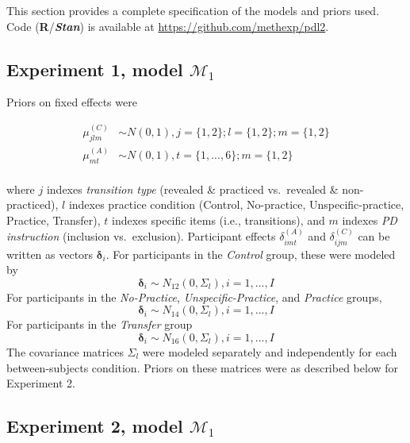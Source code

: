 \documentclass[english,,man]{apa6}
\begin{document}
\begin{appendix}
This section provides a complete specification of the models and priors
used. Code (\textbf{\textsf{R}}/\textbf{\textit{Stan}}) is available at
\url{https://github.com/methexp/pdl2}.

\hypertarget{experiment-1-model-mathcalm_1-1}{%
\subsection{\texorpdfstring{Experiment 1, model
\(\mathcal{M}_1\)}{Experiment 1, model \textbackslash{}mathcal\{M\}\_1}}\label{experiment-1-model-mathcalm_1-1}}

Priors on fixed effects were

\[
\begin{aligned}
\mu_{jlm}^{(C)} & \sim N(0, 1), j = \lbrace 1, 2 \rbrace; l = \lbrace 1, 2 \rbrace; m = \lbrace 1, 2 \rbrace\\
\mu_{mt}^{(A)} & \sim N(0, 1), t = \lbrace 1, ..., 6 \rbrace ; m = \lbrace 1, 2 \rbrace\\
\end{aligned}
\]

where \(j\) indexes \emph{transition type} (revealed \& practiced
vs.~revealed \& non-practiced), \(l\) indexes practice condition
(Control, No-practice, Unspecific-practice, Practice, Transfer), \(t\)
indexes specific items (i.e., transitions), and \(m\) indexes \emph{PD
instruction} (inclusion vs.~exclusion). Participant effects
\(\delta_{imt}^{(A)}\) and \(\delta_{ijm}^{(C)}\) can be written as
vectors \(\boldsymbol{\delta}_i\). For participants in the
\emph{Control} group, these were modeled by \[
\boldsymbol{\delta}_i \sim N_{12} (0, \Sigma_l), i = 1, ..., I
\] For participants in the \emph{No-Practice},
\emph{Unspecific-Practice}, and \emph{Practice} groups, \[
\boldsymbol{\delta}_i \sim N_{14} (0, \Sigma_l), i = 1, ..., I
\] For participants in the \emph{Transfer} group \[
\boldsymbol{\delta}_i \sim N_{16} (0, \Sigma_l), i = 1, ..., I
\] The covariance matrices \(\Sigma_l\) were modeled separately and
independently for each between-subjects condition. Priors on these
matrices were as described below for Experiment 2.

\hypertarget{experiment-2-model-mathcalm_1}{%
\subsection{\texorpdfstring{Experiment 2, model
\(\mathcal{M}_1\)}{Experiment 2, model \textbackslash{}mathcal\{M\}\_1}}\label{experiment-2-model-mathcalm_1}}


\end{appendix}
\end{document}
